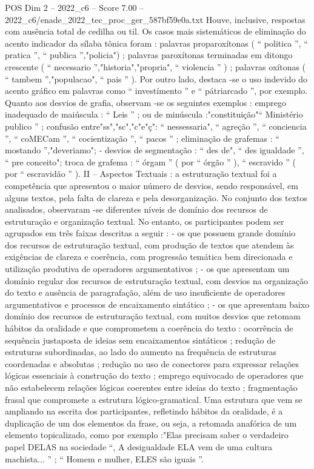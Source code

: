 \begin{textsample}{POS Dim 2 – 2022\_c6 – Score 7.00 – 2022\_c6/enade\_2022\_tec\_proc\_ger\_587bf59e0a.txt}
Houve, inclusive, respostas com ausência total de cedilha ou til.
Os casos mais sistemáticos de eliminação do acento indicador da sílaba tônica foram : palavras proparoxítonas ( “ politica ”, “ pratica ”, “ publica ”,"policia") ; palavras paroxítonas terminadas em ditongo crescente ( “ necessario ”,"historia","propria", “ violencia ” ) ; palavras oxítonas ( “ tambem ”,"populacao", “ pais ” ).
Por outro lado, destaca -se o uso indevido do acento gráfico em palavras como “ investímento ” e “ pátriarcado ”, por exemplo.
Quanto aos desvios de grafia, observam -se os seguintes exemplos : emprego inadequado de maiúscula : “ Leis ” ; ou de minúscula :"constituição"“ Ministério publico ” ; confusão entre"ss","sc","c"e"ç": “ nessessaria", “ agreção ”, “ conciencia ”, “ coMECam ”, “ cocientização ”, “ pacos ” ; eliminação de grafemas : “ mostando ”,"deveriamo"; - desvios de segmentação : “ des de", “ des igualdade ”, “ pre conceito"; troca de grafema : “ órgam ” ( por “ órgão ” ), “ escravido ” ( por “ escravidão ” ).
II – Aspectos Textuais : a estruturação textual foi a competência que apresentou o maior número de desvios, sendo responsável, em alguns textos, pela falta de clareza e pela desorganização.
No conjunto dos textos analisados, observaram -se diferentes níveis de domínio dos recursos de estruturação e organização textual.
No entanto, os participantes podem ser agrupados em três faixas descritas a seguir : - os que possuem grande domínio dos recursos de estruturação textual, com produção de textos que atendem às exigências de clareza e coerência, com progressão temática bem direcionada e utilização produtiva de operadores argumentativos ; - os que apresentam um domínio regular dos recursos de estruturação textual, com desvios na organização do texto e ausência de paragrafação, além de uso insuficiente de operadores argumentativos e processos de encaixamento sintático ; - os que apresentam baixo domínio dos recursos de estruturação textual, com muitos desvios que retomam hábitos da oralidade e que comprometem a coerência do texto : ocorrência de sequência justaposta de ideias sem encaixamentos sintáticos ; redução de estruturas subordinadas, ao lado do aumento na frequência de estruturas coordenadas e absolutas ; redução no uso de conectores para expressar relações lógicas essenciais à construção do texto ; emprego equivocado de operadores que não estabelecem relações lógicas coerentes entre ideias do texto ; fragmentação frasal que compromete a estrutura lógico-gramatical.
Uma estrutura que vem se ampliando na escrita dos participantes, refletindo hábitos da oralidade, é a duplicação de um dos elementos da frase, ou seja, a retomada anafórica de um elemento topicalizado, como por exemplo :"Elas precisam saber o verdadeiro papel DELAS na sociedade “, A desigualdade ELA vem de uma cultura machista... ” ; “ Homem e mulher, ELES são iguais ”.

\end{textsample}
